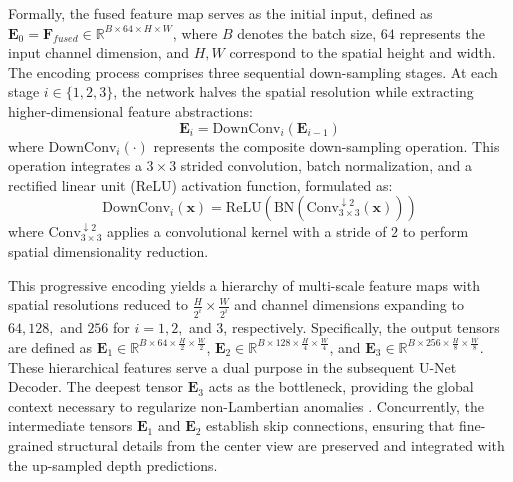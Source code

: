 \documentclass[lettersize,journal]{IEEEtran}
\begin{document}
Formally, the fused feature map serves as the initial input, defined as $\mathbf{E}_0 = \mathbf{F}_{fused} \in \mathbb{R}^{B \times 64 \times H \times W}$, where $B$ denotes the batch size, $64$ represents the input channel dimension, and $H, W$ correspond to the spatial height and width. The encoding process comprises three sequential down-sampling stages. At each stage $i \in \{1, 2, 3\}$, the network halves the spatial resolution while extracting higher-dimensional feature abstractions:
\begin{equation}
\mathbf{E}_i = \text{DownConv}_i(\mathbf{E}_{i-1})
\end{equation}
where $\text{DownConv}_i(\cdot)$ represents the composite down-sampling operation. This operation integrates a $3 \times 3$ strided convolution, batch normalization, and a rectified linear unit (ReLU) activation function, formulated as:
\begin{equation}
\text{DownConv}_i(\mathbf{x}) = \text{ReLU}(\text{BN}(\text{Conv}^{\downarrow 2}_{3 \times 3}(\mathbf{x})))
\end{equation}
where $\text{Conv}^{\downarrow 2}_{3 \times 3}$ applies a convolutional kernel with a stride of $2$ to perform spatial dimensionality reduction.

This progressive encoding yields a hierarchy of multi-scale feature maps with spatial resolutions reduced to $\frac{H}{2^i} \times \frac{W}{2^i}$ and channel dimensions expanding to $64, 128,$ and $256$ for $i=1, 2,$ and $3$, respectively. Specifically, the output tensors are defined as $\mathbf{E}_1 \in \mathbb{R}^{B \times 64 \times \frac{H}{2} \times \frac{W}{2}}$, $\mathbf{E}_2 \in \mathbb{R}^{B \times 128 \times \frac{H}{4} \times \frac{W}{4}}$, and $\mathbf{E}_3 \in \mathbb{R}^{B \times 256 \times \frac{H}{8} \times \frac{W}{8}}$. These hierarchical features serve a dual purpose in the subsequent U-Net Decoder. The deepest tensor $\mathbf{E}_3$ acts as the bottleneck, providing the global context necessary to regularize non-Lambertian anomalies \cite{lin2017}. Concurrently, the intermediate tensors $\mathbf{E}_1$ and $\mathbf{E}_2$ establish skip connections, ensuring that fine-grained structural details from the center view are preserved and integrated with the up-sampled depth predictions.

\subsection{}
\end{document}
